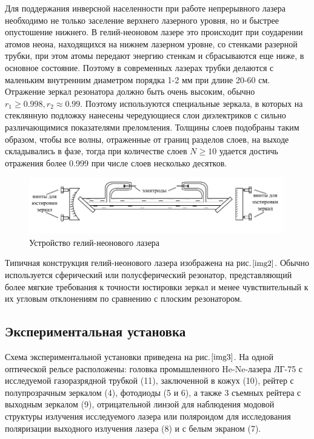 \documentclass[a4paper,12pt]{article}
\begin{document}
Для поддержания инверсной населенности при работе непрерывного лазера необходимо не только заселение верхнего лазерного уровня, но и быстрее опустошение нижнего. В гелий-неоновом лазере это происходит при соударении атомов неона, находящихся на нижнем лазерном уровне, со стенками разерной трубки, при этом атомы передают энергию стенкам и сбрасываются еще ниже, в основное состояние. Поэтому в современных лазерах трубки делаются с маленьким внутренним диаметром порядка 1-2 мм при длине 20-60 см. Отражение зеркал резонатора должно быть очень высоким, обычно $r_1\geq0.998, r_2\approx0.99$. Поэтому используются специальные зеркала, в которых на стеклянную подложку нанесены чередующиеся слои диэлектриков с сильно различающимися показателями преломления. Толщины слоев подобраны таким образом, чтобы все волны, отраженные от границ разделов слоев, на выходе складывались в фазе, тогда при количестве слоев $N\geq 10$ удается достичь отражения более 0.999 при числе слоев несколько десятков.

\begin{figure}[h]
\centering
\includegraphics[width=0.7\linewidth]{img2.png}
\caption{Устройство гелий-неонового лазера}
\label{img2}
\end{figure}

Типичная конструкция гелий-неонового лазера изображена на рис.$\ref{img2}$. Обычно используется сферический или полусферический резонатор, представляющий более мягкие требования к точности юстировки зеркал и менее чувствительный к их угловым отклонениям по сравнению с плоским резонатором.

\subsection{Экспериментальная установка}

Схема экспериментальной установки приведена на рис.$\ref{img3}$. На одной оптической рельсе расположены: головка промышленного He-Ne-лазера ЛГ-75 с исследуемой газоразрядной трубкой (11), заключенной в кожух (10), рейтер с полупрозрачным зеркалом (4), фотодиоды (5 и 6), а также 3 съемных рейтера с выходным зеркалом (9), отрицательной линзой для наблюдения модовой структуры излучения исследуемого лазера или поляроидом для исследования поляризации выходного излучения лазера (8) и с белым экраном (7).
\end{document}
